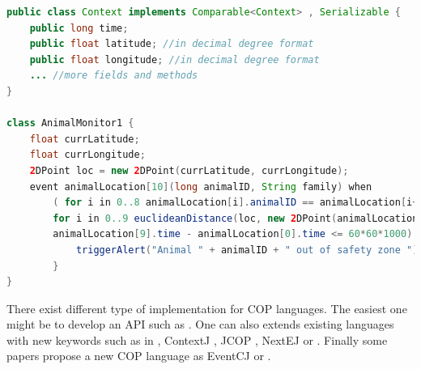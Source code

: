 \documentclass[a4paper]{article}
\begin{document}
\begin{lstlisting}[float, language=Java, caption=EventJava context-dependent behaviour, label={listing:eventjavacontextuse}]
public class Context implements Comparable<Context> , Serializable {
	public long time;
	public float latitude; //in decimal degree format
	public float longitude; //in decimal degree format
	... //more fields and methods
}

class AnimalMonitor1 {
	float currLatitude;
	float currLongitude;
	2DPoint loc = new 2DPoint(currLatitude, currLongitude);
	event animalLocation[10](long animalID, String family) when
		( for i in 0..8 animalLocation[i].animalID == animalLocation[i+1].animalID &&
		for i in 0..9 euclideanDistance(loc, new 2DPoint(animalLocation[i].latitude, animalLocation[i].longitude)) > 0.5 &&
		animalLocation[9].time - animalLocation[0].time <= 60*60*1000) {
			triggerAlert("Animal " + animalID + " out of safety zone ");
		}
}
\end{lstlisting}

There exist different type of implementation for COP languages. The easiest one might be to develop an API such as \cite{appeltauer_dedicated_2008}. One can also extends existing languages with new keywords such as in \cite{clarke_semantics_2009}, ContextJ \cite{haupt_contextj:_2011}, JCOP \cite{appeltauer_declarative_2013}, NextEJ \cite{kamina_towards_2009} or \cite{ghezzi_context_2010}. Finally some papers propose a new COP language as  EventCJ \cite{kamina_eventcj:_2011} or \cite{kamina_unified_2013}.
\end{document}
